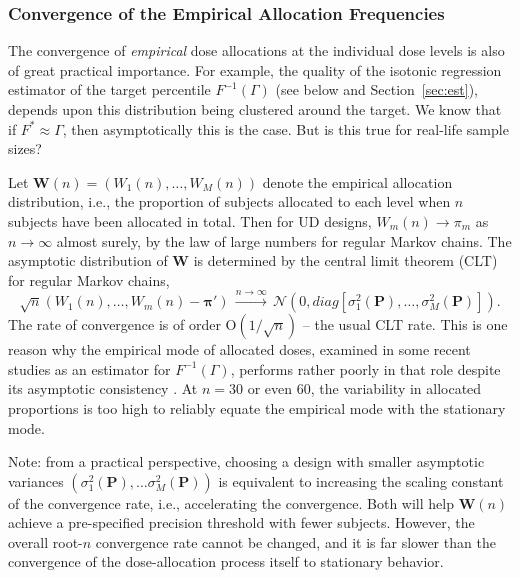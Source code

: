 \subsubsection{Convergence of the Empirical Allocation Frequencies}\label{sec:asymvar}

The convergence of \emph{empirical} dose allocations at the individual dose levels is also of great practical importance. For example, the quality of the isotonic regression estimator of the target percentile $F^{-1}(\Gamma)$ (see below and Section~\ref{sec:est}), depends upon this distribution being clustered around the target. We know that if $F^*\approx\Gamma$, then asymptotically this is the case. But is this true for real-life sample sizes?


Let $\mathbf{W}(n)=\left(W_1(n),\ldots ,W_M(n)\right)$ denote the empirical allocation distribution, i.e., the proportion of subjects allocated to each level when $n$ subjects have been allocated in total. Then for UD designs, $W_m(n)\to\pi_m$ as $n\rightarrow \infty$ almost surely, by the law of large numbers for regular Markov chains. The asymptotic distribution of $\mathbf{W}$ is determined by the central limit theorem (CLT) for regular Markov chains,
%
\begin{equation}\label{eq:CLT}
\sqrt{n}\left(W_1(n),\ldots, W_m(n)-\boldsymbol{\pi}\prime\right)\,\stackrel{n
\rightarrow \infty}{\longrightarrow}
\,\mathcal{N}\left(0,diag\left[\sigma_1^2(\mathbf{P})
,\ldots ,\sigma_M^2(\mathbf{P})\right] \right).
\end{equation}
%
The rate of convergence is of order $\mathrm{O}\left(1/\sqrt{n}\right)$ -- the usual CLT rate. This is one reason why the empirical mode of allocated doses, examined in some recent studies as an estimator for $F^{-1}(\Gamma)$, performs rather poorly in that role despite its asymptotic consistency \citep{Giov:Pint:Pint:prop:1998}. At $n=30$ or even $60$, the variability in allocated proportions is too high to reliably equate the empirical mode with the stationary mode.

Note: from a practical perspective, choosing a design with smaller asymptotic variances $\left(\sigma_1^2(\mathbf{P}),\ldots\sigma_M^2(\mathbf{P})\right)$ is equivalent to increasing the scaling constant of the convergence rate, i.e., accelerating the convergence. Both will help $\mathbf{W}(n)$ achieve a pre-specified precision threshold with fewer subjects. However, the overall root-$n$ convergence rate cannot be changed, and it is far slower than the convergence of the dose-allocation process itself to stationary behavior.

